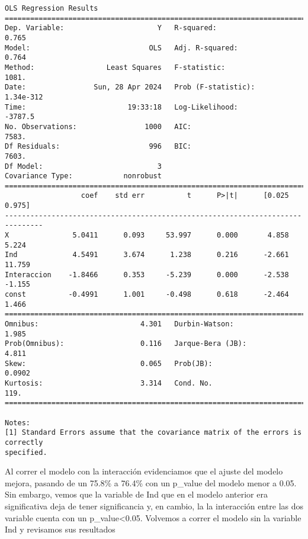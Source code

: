 \documentclass[11pt]{article}
\begin{document}
    \begin{Verbatim}[commandchars=\\\{\}]
                            OLS Regression Results
==============================================================================
Dep. Variable:                      Y   R-squared:                       0.765
Model:                            OLS   Adj. R-squared:                  0.764
Method:                 Least Squares   F-statistic:                     1081.
Date:                Sun, 28 Apr 2024   Prob (F-statistic):          1.34e-312
Time:                        19:33:18   Log-Likelihood:                -3787.5
No. Observations:                1000   AIC:                             7583.
Df Residuals:                     996   BIC:                             7603.
Df Model:                           3
Covariance Type:            nonrobust
===============================================================================
                  coef    std err          t      P>|t|      [0.025      0.975]
-------------------------------------------------------------------------------
X               5.0411      0.093     53.997      0.000       4.858       5.224
Ind             4.5491      3.674      1.238      0.216      -2.661      11.759
Interaccion    -1.8466      0.353     -5.239      0.000      -2.538      -1.155
const          -0.4991      1.001     -0.498      0.618      -2.464       1.466
==============================================================================
Omnibus:                        4.301   Durbin-Watson:                   1.985
Prob(Omnibus):                  0.116   Jarque-Bera (JB):                4.811
Skew:                           0.065   Prob(JB):                       0.0902
Kurtosis:                       3.314   Cond. No.                         119.
==============================================================================

Notes:
[1] Standard Errors assume that the covariance matrix of the errors is correctly
specified.
    \end{Verbatim}

    Al correr el modelo con la interacción evidenciamos que el ajuste del
modelo mejora, pasando de un 75.8\% a 76.4\% con un p\_value del modelo
menor a 0.05. Sin embargo, vemos que la variable de Ind que en el modelo
anterior era significativa deja de tener significancia y, en cambio, la
la interacción entre las dos variable cuenta con un
p\_value\textless0.05. Volvemos a correr el modelo sin la variable Ind y
revisamos sus resultados
\end{document}
